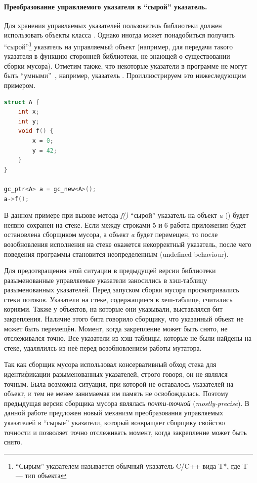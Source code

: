\paragraph{Преобразование управляемого указателя в ``сырой'' указатель.}
Для хранения управляемых указателей пользователь библиотеки должен использовать объекты 
класса . 
Однако иногда может понадобиться получить ``сырой''\footnote{``Сырым'' указателем 
называется обычный указатель C/C++ вида T*, где T --- тип объекта} указатель на 
управляемый объект (например, для передачи такого указателя в функцию сторонней библиотеки, 
не знающей о существовании сборки мусора). 
Отметим также, что некоторые указатели в программе не могут быть 
``умными''~\cite{book:jones1996garbage}, например, указатель . 
Проиллюстрируем это нижеследующим примером.

\begin{minipage}{\linewidth}
\begin{lstlisting}[language={c++}, caption={Неявное разыменование 
	\code{gc\_ptr}}, label={code:this_example}]
struct A {
    int x;
    int y;
    void f() {
        x = 0;
        y = 42;
    }
}

gc_ptr<A> a = gc_new<A>();
a->f();
\end{lstlisting}
\end{minipage}

В данном примере при вызове метода \emph{f()} ``сырой'' указатель на объект \emph{a} 
() будет неявно сохранен на стеке. 
Если между строками 5 и 6 работа приложения будет остановлена сборщиком мусора, а объект 
\emph{a} будет перемещен, то после возобновления исполнения на стеке окажется некорректный 
указатель, после чего поведения программы становится неопределенным (undefined behaviour). 

Для предотвращения этой ситуации в предыдущей версии библиотеки разыменованные управляемые 
указатели заносились в хэш-таблицу разыменованных указателей. 
Перед запуском сборки мусора просматривались стеки потоков. 
Указатели на стеке, содержащиеся в хеш-таблице, считались корнями. 
Также у объектов, на которые они указывали, выставлялся бит закрепления. 
Наличие этого бита говорило сборщику, что указанный объект не может быть перемещён. 
Момент, когда закрепление может быть снято, не отслеживался точно. 
Все указатели из хэш-таблицы, которые не были найдены на стеке, удалялилсь из неё перед 
возобновлением работы мутатора.

Так как сборщик мусора использовал консервативный обход стека для идентификации 
разыменованных указателей, строго говоря, он не являлся точным. 
Была возможна ситуация, при которой не оставалось указателей на объект, и тем не менее 
занимаемая им память не освобождалась. 
Поэтому предыдущая версия сборщика мусора являлась \emph{почти-точной} (\emph{mostly-precise}). 
В данной работе предложен новый механизм преобразования управляемых указателей в ``сырые'' 
указатели, который возвращает сборщику свойство точности и позволяет точно отслеживать 
момент, когда закрепление может быть снято.